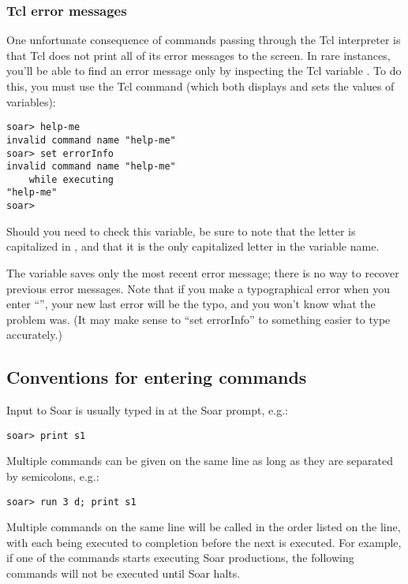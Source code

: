 {\subsubsection*{Tcl error messages}

One unfortunate consequence of commands passing through the Tcl interpreter is
that Tcl does not print all of its error messages to the screen. In rare
instances, you'll be able to find an error message only by inspecting the Tcl
variable . To do this, you must use the Tcl command 
(which both displays and sets the values of variables):

\begin{verbatim}
soar> help-me
invalid command name "help-me"
soar> set errorInfo
invalid command name "help-me"
    while executing
"help-me"
soar> 
\end{verbatim}

Should you need to check this variable, be sure to note that the letter
 is capitalized in , and that it is the only
capitalized letter in the variable name. 

The  variable saves only the most recent error message; there
is no way to recover previous error messages. Note that if you make a
typographical error when you enter ``'', your new last
error will be the typo, and you won't know what the problem was. (It may make
sense to  ``set errorInfo'' to something easier to type
accurately.)


\subsection{Conventions for entering commands}

Input to Soar is usually typed in at the Soar prompt, e.g.:
\begin{verbatim}
soar> print s1
\end{verbatim}

Multiple commands can be given on the same line as long as they are separated
by semicolons, e.g.:

\begin{verbatim}
soar> run 3 d; print s1
\end{verbatim}

Multiple commands on the same line will be called in the order listed on the
line, with each being executed to completion before the next is executed. For
example, if one of the commands starts executing Soar productions, the
following commands will not be executed until Soar halts.


}
